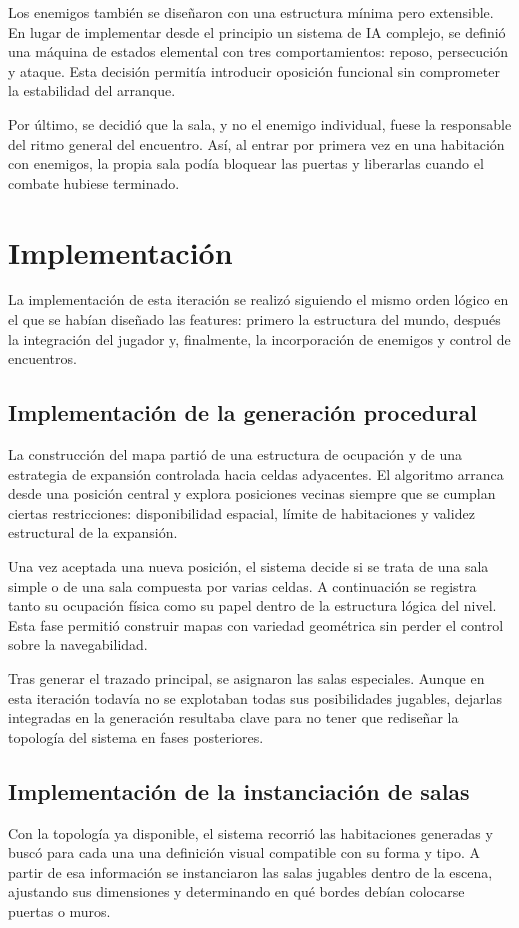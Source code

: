 Los enemigos también se diseñaron con una estructura mínima pero extensible. En lugar de
implementar desde el principio un sistema de IA complejo, se definió una máquina de estados
elemental con tres comportamientos: reposo, persecución y ataque. Esta decisión permitía
introducir oposición funcional sin comprometer la estabilidad del arranque.

Por último, se decidió que la sala, y no el enemigo individual, fuese la responsable del
ritmo general del encuentro. Así, al entrar por primera vez en una habitación con enemigos,
la propia sala podía bloquear las puertas y liberarlas cuando el combate hubiese terminado.

\section{Implementación}
La implementación de esta iteración se realizó siguiendo el mismo orden lógico en el que se
habían diseñado las features: primero la estructura del mundo, después la integración del
jugador y, finalmente, la incorporación de enemigos y control de encuentros.

\subsection{Implementación de la generación procedural}
La construcción del mapa partió de una estructura de ocupación y de una estrategia de
expansión controlada hacia celdas adyacentes. El algoritmo arranca desde una posición
central y explora posiciones vecinas siempre que se cumplan ciertas restricciones:
disponibilidad espacial, límite de habitaciones y validez estructural de la expansión.

Una vez aceptada una nueva posición, el sistema decide si se trata de una sala simple o de
una sala compuesta por varias celdas. A continuación se registra tanto su ocupación física
como su papel dentro de la estructura lógica del nivel. Esta fase permitió construir mapas
con variedad geométrica sin perder el control sobre la navegabilidad.

Tras generar el trazado principal, se asignaron las salas especiales. Aunque en esta
iteración todavía no se explotaban todas sus posibilidades jugables, dejarlas integradas en
la generación resultaba clave para no tener que rediseñar la topología del sistema en fases
posteriores.

\subsection{Implementación de la instanciación de salas}
Con la topología ya disponible, el sistema recorrió las habitaciones generadas y buscó para
cada una una definición visual compatible con su forma y tipo. A partir de esa información
se instanciaron las salas jugables dentro de la escena, ajustando sus dimensiones y
determinando en qué bordes debían colocarse puertas o muros.

